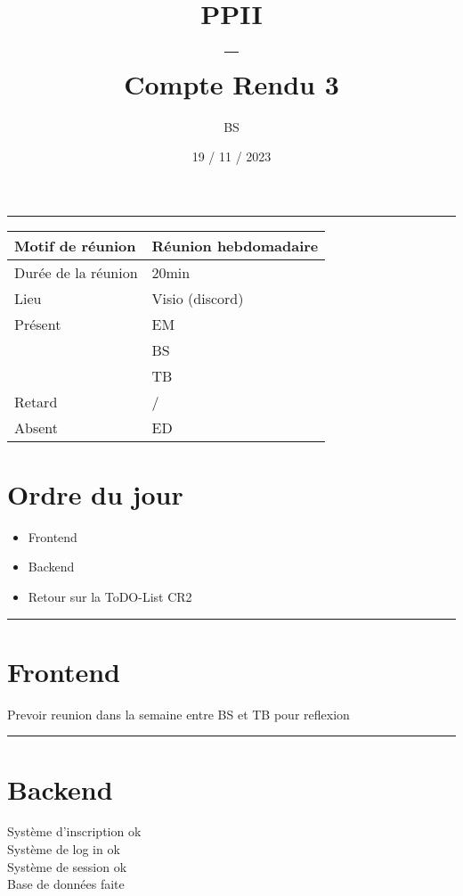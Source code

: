 \documentclass[10pt,a4paper]{report}
\title{PPII \\ -- \\ Compte Rendu 3}
\date{19 / 11 / 2023}
\author{BS}
\begin{document}
\maketitle

\tableofcontents \bigskip

\noindent\rule{\linewidth}{0.5mm} \bigskip

                \begin{tabular}{|l | l|}
                        \hline
                Motif de réunion & Réunion hebdomadaire \\
                        \hline
                Durée de la réunion & 20min \\
                        \hline
                Lieu & Visio (discord) \\
                        \hline
                Présent & EM \\
                        & BS \\
                        & TB  \\
                        \hline
                Retard  & / \\
                        \hline
                Absent  & ED \\
                        \hline
                \end{tabular}


\section{Ordre du jour}
\begin{itemize}
        \item Frontend
        \item Backend
        \item Retour sur la ToDO-List CR2
\end{itemize}

\noindent\rule{\linewidth}{0.5mm} \bigskip
\section{Frontend}
Prevoir reunion dans la semaine entre BS et TB pour reflexion


\noindent\rule{\linewidth}{0.5mm} \bigskip
\section{Backend}
Système d'inscription ok \\
Système de log in ok \\
Système de session ok \\
Base de données faite \\
\end{document}
